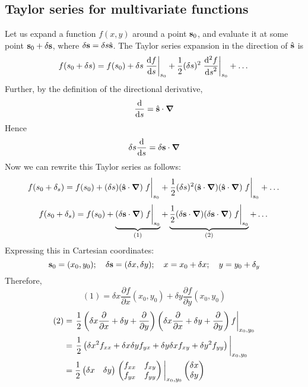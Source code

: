 \subsection{Taylor series for multivariate functions}
Let us expand a function \(f(x, y)\) around a point \(\vb s_0\), and evaluate it at some point \(\vb s_0 + \delta \vb s\), where \(\delta \vb s = \delta s \hat{\vb s}\).
The Taylor series expansion in the direction of \(\hat{\vb s}\) is
\[
	f(s_0 + \delta s) = f(s_0) + \delta s \eval{\frac{\dd{f}}{\dd{s}} }_{s_0} + \frac{1}{2} (\delta s)^2\eval{\frac{\dd^2 f}{\dd{s}^2}}_{s_0} + \dots
\]
Further, by the definition of the directional derivative,
\[
	\frac{\dd}{\dd{s}} = \hat{\vb s}\cdot \grad
\]
Hence
\[
	\delta s \frac{\dd}{\dd{s}} = \delta \vb s \cdot \grad
\]
Now we can rewrite this Taylor series as follows:
\[
	f(s_0 + \delta_s) = f(s_0) + (\delta s)(\hat{\vb s} \cdot \grad) \eval{f}_{s_0} + \frac{1}{2}(\delta s)^2(\hat{\vb s} \cdot \grad)(\hat{\vb s} \cdot \grad)\eval{f}_{s_0} + \dots
\]
\[
	f(s_0 + \delta_s) = f(s_0) + \underbrace{(\delta \vb s \cdot \grad) \eval{f}_{s_0}}_{(1)} + \underbrace{\frac{1}{2}(\delta \vb s \cdot \grad)(\delta \vb s \cdot \grad)\eval{f}_{s_0}}_{(2)} + \dots
\]
Expressing this in Cartesian coordinates:
\[
	\vb s_0 = (x_0, y_0);\quad \delta \vb s = (\delta x, \delta y);\quad x=x_0+\delta x;\quad y=y_0+\delta_y
\]
Therefore,
\[
	(1) = \delta x \frac{\partial f}{\partial x}(x_0, y_0) + \delta y \frac{\partial f}{\partial y}(x_0, y_0)
\]
\begin{align*}
	(2) & = \eval{\frac{1}{2}\left( \delta x \frac{\partial}{\partial x} + \delta y + \frac{\partial}{\partial y} \right)\left( \delta x \frac{\partial}{\partial x} + \delta y + \frac{\partial}{\partial y} \right)f}_{x_0, y_0} \\
	    & = \eval{\frac{1}{2}\left( \delta x^2 f_{xx} + \delta x \delta y f_{yx} + \delta y \delta x f_{xy} + \delta y^2 f_{yy} \right)}_{x_0, y_0}                                                                                \\
	    & = \frac{1}{2}\begin{pmatrix}
		\delta x & \delta y
	\end{pmatrix} \eval{\begin{pmatrix}
			f_{xx} & f_{xy} \\
			f_{yx} & f_{yy}
		\end{pmatrix}}_{x_0, y_0} \begin{pmatrix}
		\delta x \\ \delta y
	\end{pmatrix}
\end{align*}

